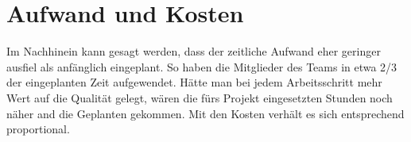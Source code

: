 \section{Aufwand und Kosten}
Im Nachhinein kann gesagt werden, dass der zeitliche Aufwand eher geringer ausfiel als anfänglich eingeplant. So haben die Mitglieder des Teams in etwa 2/3 der eingeplanten Zeit aufgewendet. Hätte man bei jedem Arbeitsschritt mehr Wert auf die Qualität gelegt, wären die fürs Projekt eingesetzten Stunden noch näher and die Geplanten gekommen. Mit den Kosten verhält es sich entsprechend proportional. 

